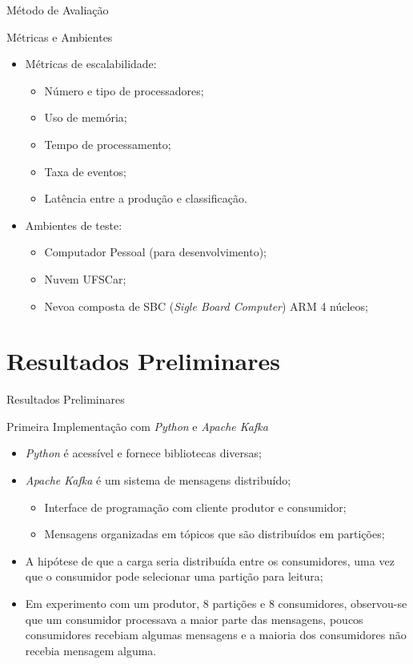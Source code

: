 \documentclass[aspectratio=43,10pt]{beamer}
\begin{document}
\begin{frame}[fragile]{Método de Avaliação}
  \begin{alertblock}{Métricas e Ambientes}
    \begin{itemize}
      \item Métricas de escalabilidade:
      \begin{itemize}
        \item Número e tipo de processadores;
        \item Uso de memória;
        \item Tempo de processamento;
        \item Taxa de eventos;
        \item Latência entre a produção e classificação.
      \end{itemize}
      \item Ambientes de teste:
      \begin{itemize}
        \item Computador Pessoal (para desenvolvimento);
        \item Nuvem UFSCar;
        \item Nevoa composta de SBC (\emph{Sigle Board Computer}) ARM 4 núcleos;
      \end{itemize}
    \end{itemize}
  \end{alertblock}
\end{frame}


\section{Resultados Preliminares}
\begin{frame}[fragile]{Resultados Preliminares}

  \begin{alertblock}{Primeira Implementação com \emph{Python} e \emph{Apache Kafka}}
    \begin{itemize}%
      \item \emph{Python} é acessível e fornece bibliotecas diversas;
      \item \emph{Apache Kafka} é um sistema de mensagens distribuído;
      \begin{itemize}
        \item Interface de programação com cliente produtor e consumidor;
        \item Mensagens organizadas em tópicos que são distribuídos em partições;
      \end{itemize}
      \item A hipótese de que a carga seria distribuída entre os consumidores,
      uma vez que o consumidor pode selecionar uma partição para leitura;
      \item Em experimento com um produtor, 8 partições e 8 consumidores,
      observou-se que um consumidor processava a maior parte das mensagens,
      poucos consumidores recebiam algumas mensagens e a maioria dos consumidores
      não recebia mensagem alguma.
    \end{itemize}
  \end{alertblock}
\end{frame}
\end{document}
